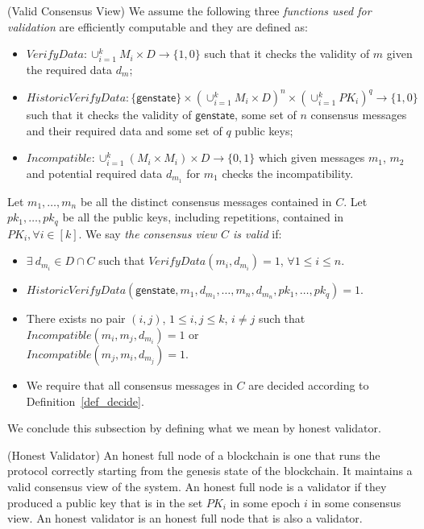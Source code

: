 \begin{definition}(Valid Consensus View)
\label{def:valid_consensus}
\noindent 
We assume the following three \emph{functions used for validation} are efficiently computable and they are defined as: 

\begin{itemize}
\item $\mathit{VerifyData}: \cup_{i=1}^k M_i \times D \rightarrow \{1, 0\}$ such that it 
checks the validity of $m$ given the required data $\mathit{d_{m}}$;
\item $\mathit{HistoricVerifyData}: \{\mathsf{genstate}\} \times (\cup_{i=1}^k M_i \times D)^n \times (\cup_{i=1}^k \mathit{PK_i})^q \rightarrow \{1, 0\}$ 
such that it checks the validity of $\mathsf{genstate}$, some set of $n$ consensus messages and their required data and some set of $q$ public keys;
\item $\mathit{Incompatible}: \cup_{i=1}^k (M_i \times M_i) \times D \rightarrow \{0,1\}$ which 
given messages $m_1$, $m_2$ and potential required data $d_{m_1}$ for $m_1$ checks the incompatibility.
\end{itemize}

\noindent Let $m_1,\ldots, m_n$ be all the distinct consensus messages contained in $C$. Let $\mathit{pk_1},\ldots, \mathit{pk_q}$ be all the 
public keys, including repetitions, contained in $\mathit{PK_i}, \forall i \in[k]$.
We say \emph{the consensus view $C$ is valid} if: 
\begin{itemize}
\item $\exists \ d_{m_i} \in D \cap C$ such that $\mathit{VerifyData}(m_i, d_{m_i}) = 1$, $\forall 1\leq i \leq n$. 
\item $\mathit{HistoricVerifyData}(\mathsf{genstate}, m_1, d_{m_1}, \ldots, m_n, d_{m_n}, \mathit{pk_1},\ldots, \mathit{pk_q}) = 1$. 
\item There exists no pair $(i,j)$, $1 \leq i,j \leq k$, $i \neq j$ such that $\mathit{Incompatible}(m_i, m_j, d_{m_i}) = 1$ 
or \\ $\mathit{Incompatible}(m_j, m_i, d_{m_j}) = 1$.
\item We require that all consensus messages in $C$ are decided according to Definition~\ref{def_decide}.
\end{itemize}
\end{definition}

\noindent We conclude this subsection by defining what we mean by honest validator.
\begin{definition}(Honest Validator)
\label{def:honest_validator}
An honest full node of a blockchain is one that runs the protocol correctly starting from the genesis state of the blockchain. 
It maintains a valid consensus view of the system. An honest full node is a validator if they produced a public key that is in the set 
$\mathit{PK_i}$ in some epoch $i$ in some consensus view. An honest validator is an honest full node that is also a validator.
\end{definition}
 
